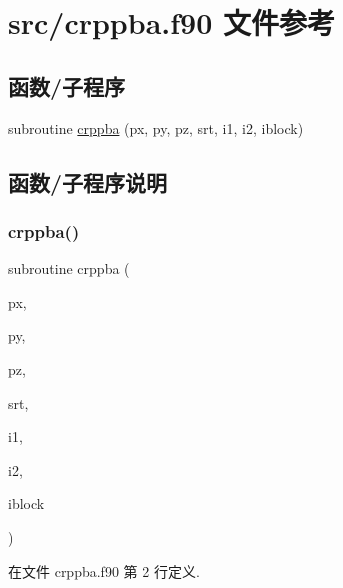 \hypertarget{crppba_8f90}{}\section{src/crppba.f90 文件参考}
\label{crppba_8f90}
\subsection*{函数/子程序}
\begin{DoxyCompactItemize}
\item 
subroutine \mbox{\hyperlink{crppba_8f90_a246c1d0094adf66f5065496f14ef1127}{crppba}} (px, py, pz, srt, i1, i2, iblock)
\end{DoxyCompactItemize}


\subsection{函数/子程序说明}
\mbox{\label{crppba_8f90_a246c1d0094adf66f5065496f14ef1127}} 
\subsubsection{\texorpdfstring{crppba()}{crppba()}}
{\footnotesize\ttfamily subroutine crppba (\begin{DoxyParamCaption}\item[{}]{px,  }\item[{}]{py,  }\item[{}]{pz,  }\item[{}]{srt,  }\item[{}]{i1,  }\item[{}]{i2,  }\item[{}]{iblock }\end{DoxyParamCaption})}



在文件 crppba.\+f90 第 2 行定义.

